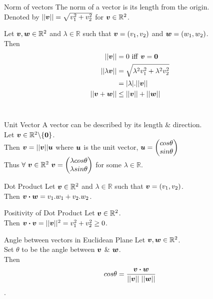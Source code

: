 \documentclass[11pt,a4paper]{article}
\begin{document}
\subtitle{Definition 1.04 - }{Norm of vectors}
The norm of a vector is its length from the origin. \\
Denoted by $||\boldsymbol{v}|| = \sqrt{v_{1}^{2} + v_{2}^{2}}$ for $\boldsymbol{v} \in \mathbb{R}^2$. \\

\subtitle{Theorem 1.05}{}
Let $\boldsymbol{v}, \boldsymbol{w} \in \mathbb{R}^2$ and $\lambda \in \mathbb{R} $ such that $\boldsymbol{v} = (v_1,v_2)$ and $\boldsymbol{w} = (w_1,w_2)$. \\
Then
\begin{align*}
  ||\boldsymbol{v}|| &= 0\ \mathrm{iff}\ \boldsymbol{v} = \boldsymbol{0}\\
  ||\lambda\boldsymbol{v}|| &= \sqrt{\lambda^2v_{1}^{2} + \lambda^2v_{2}^{2}} \\
  &= |\lambda|.||\boldsymbol{v}|| \\
  ||\boldsymbol{v} + \boldsymbol{w}|| &\leq ||\boldsymbol{v}|| + ||\boldsymbol{w}||
\end{align*} \\

\subtitle{Definition 1.06 - }{Unit Vector}
A vector can be described by its length \& direction. \\
Let $\boldsymbol{v} \in \mathbb{R}^2\backslash\{\boldsymbol{0}\}$. \\
Then $\boldsymbol{v} = ||\boldsymbol{v}||\boldsymbol{u}$ where $\boldsymbol{u}$ is the unit vector, $\boldsymbol{u} = \begin{pmatrix} cos\theta \\ sin\theta \end{pmatrix}$ \\
Thus $\forall\ \vect{v} \in \mathbb{R}^2\ \vect{v} = \begin{pmatrix} \lambda cos\theta \\ \lambda sin\theta \end{pmatrix}$ for some $\lambda \in \mathbb{R}$. \\

\subtitle{Definition 1.07 - }{Dot Product}
Let $\boldsymbol{v} \in \mathbb{R}^2$ and $\lambda \in \mathbb{R}$ such that $\boldsymbol{v} = (v_1,v_2)$. \\
Then $\boldsymbol{v} \boldsymbol{\cdot} \boldsymbol{w} = v_1.w_1 + v_2.w_2$. \\

\subtitle{Remark 1.08 - }{Positivity of Dot Product}
Let $\boldsymbol{v} \in \mathbb{R}^2$. \\
Then $\boldsymbol{v} \boldsymbol{\cdot} \boldsymbol{v} = ||\boldsymbol{v}||^2 = v_{1}^{2} + v_{2}^{2} \geq 0$. \\

\subtitle{Remark 1.09 - }{Angle between vectors in Euclidean Plane}
Let $\boldsymbol{v}, \boldsymbol{w} \in \mathbb{R}^2$. \\
Set $\theta$ to be the angle between $\boldsymbol{v}$ \& $\boldsymbol{w}$. \\
Then $$cos\theta = \frac{\boldsymbol{v} \boldsymbol{\cdot} \boldsymbol{w}}{||\boldsymbol{v}||\ ||\boldsymbol{w}||}$$.
\end{document}
